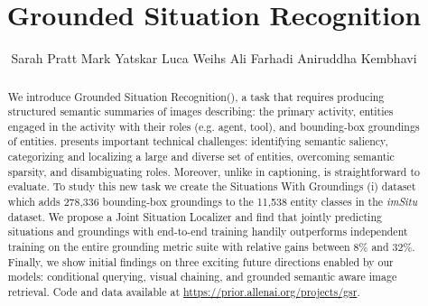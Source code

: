 \documentclass[runningheads]{llncs}
\newcommand{\dataset}{\mbox{\sc{SW}}i\mbox{\sc{G}}\xspace}
\newcommand{\imsitu}{\emph{imSitu}\xspace}
\newcommand{\task}{Grounded Situation Recognition\xspace}
\newcommand{\tasksmall}{\mbox{\sc{GSR}}\xspace}
\begin{document}
\pagestyle{headings}
\mainmatter

\title{Grounded Situation Recognition \vspace{-3mm}} 


\author{Sarah Pratt 
Mark Yatskar 
Luca Weihs 
Ali Farhadi 
Aniruddha Kembhavi }



\maketitle
\vspace{-0.8em}

\vspace{-2mm}
\begin{abstract}
We introduce \task (\tasksmall), a task that requires producing structured semantic summaries of images describing: the primary activity, entities engaged in the activity with their roles (e.g. agent, tool), and bounding-box groundings of entities. \tasksmall presents important technical challenges: identifying semantic saliency, categorizing and localizing a large and diverse set of entities, overcoming semantic sparsity, and disambiguating roles. Moreover, unlike in captioning, \tasksmall is straightforward to evaluate. To study this new task we create the Situations With Groundings (\dataset{}) dataset which adds 278,336 bounding-box groundings to the 11,538 entity classes in the \imsitu dataset. We propose a Joint Situation Localizer and find that jointly predicting situations and groundings with end-to-end training handily outperforms independent training on the entire grounding metric suite with relative gains between 8\% and 32\%. Finally, we show initial findings on three exciting future directions enabled by our models: conditional querying, visual chaining, and grounded semantic aware image retrieval. Code and data available at \href{https://prior.allenai.org/projects/gsr}{ \color{blue} https://prior.allenai.org/projects/gsr}. \vspace{-1mm}



\vspace{-3mm}
\end{abstract}
\end{document}
